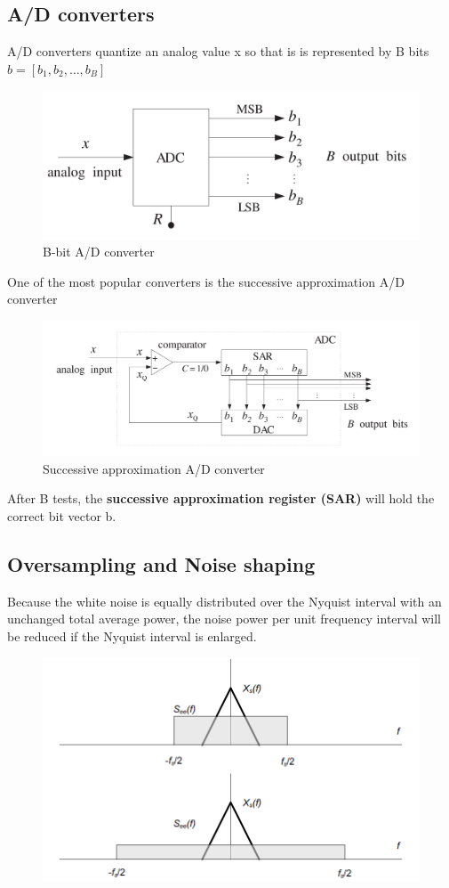 \subsection{A/D converters}
A/D converters quantize an analog value x so that is is represented by B bits  $b=[b_1, b_2,…,b_B]$
\begin{figure}[h!]
    \centering
    \includegraphics[width=0.5\linewidth]{img/21.png}
    \caption{B-bit A/D converter}
\end{figure}
\newpage
One of the most popular converters is the successive approximation A/D converter
\begin{figure}[h!]
    \centering
    \includegraphics[width=0.5\linewidth]{img/22.png}
    \caption{Successive approximation A/D converter}
\end{figure}

After B tests, the \textbf{successive approximation register (SAR)} will hold the correct bit vector b.
\subsection{Oversampling and Noise shaping}
Because the white noise is equally distributed over the Nyquist interval with an unchanged total average power, the noise power per unit frequency interval will be reduced if the Nyquist interval is enlarged.
\begin{figure}[h!]
    \centering
    \includegraphics[width=0.5\linewidth]{img/24.png}
\end{figure}

